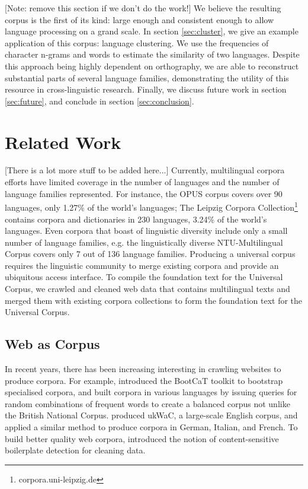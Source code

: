 \documentclass[11pt]{article}
\begin{document}
[Note: remove this section if we don't do the work!] We believe the resulting corpus is the first of its kind: large enough and consistent enough to allow language processing on a grand scale. In section \ref{sec:cluster}, we give an example application of this corpus: language clustering. We use the frequencies of character n-grams and words to estimate the similarity of two languages. Despite this approach being highly dependent on orthography, we are able to reconstruct substantial parts of several language families, demonstrating the utility of this resource in cross-linguistic research. Finally, we discuss future work in section \ref{sec:future}, and conclude in section \ref{sec:conclusion}.


\section{Related Work} \label{sec:related}

[There is a lot more stuff to be added here...]
Currently, multilingual corpora efforts have limited coverage in the number of languages and the number of language families represented. For instance, the OPUS corpus \cite{tiedemann2012opus} covers over 90 languages, only 1.27\% of the world's languages; The Leipzig Corpora Collection\footnote{corpora.uni-leipzig.de} \cite{biemann2007leipzig} contains corpora and dictionaries in 230 languages, 3.24\% of the world's languages. Even corpora that boast of linguistic diversity include only a small number of language families, e.g. the linguistically diverse NTU-Multilingual Corpus \cite{tan2011ntu} covers only 7 out of 136 language families. Producing a universal corpus requires the linguistic community to merge existing corpora and provide an ubiquitous access interface. To compile the foundation text for the Universal Corpus, we crawled and cleaned web data that contains multilingual texts and merged them with existing corpora collections to form the foundation text for the Universal Corpus.


\subsection{Web as Corpus}

In recent years, there has been increasing interesting in crawling websites to produce corpora. For example,  introduced the BootCaT toolkit to bootstrap specialised corpora, and  built corpora in various languages by issuing queries for random combinations of frequent words to create a balanced corpus not unlike the British National Corpus.  produced ukWaC, a large-scale English corpus, and \cite{baroni2009wacky} applied a similar method to produce corpora in German, Italian, and French. To build better quality web corpora,  introduced the notion of content-sensitive boilerplate detection for cleaning data.
\end{document}
